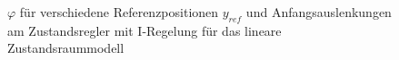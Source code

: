 \begin{figure}[H]
    \centering
    \caption[$\varphi$ für Regler mit I-Regelung (linear)]{$\varphi$ für verschiedene Referenzpositionen $y_{ref}$ und Anfangsauslenkungen am Zustandsregler mit I-Regelung für das lineare Zustandsraummodell}
    \label{fig:Bild22}
\end{figure}

